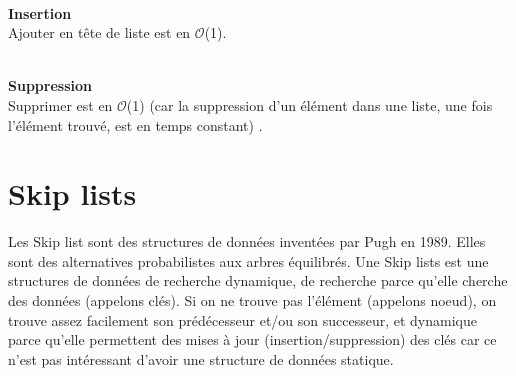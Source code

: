 \documentclass[hidelinks,a4paper,12pt]{article}
\begin{document}
~\\

\textbf {Insertion} \\
Ajouter en tête de liste est en $\mathcal{O}$(1)\cite{ArticleFacSciencesLile}.

~\\

\textbf {Suppression} \\
Supprimer est en $\mathcal{O}$(1) (car la suppression d’un élément dans une liste, une fois l’élément trouvé, est en temps constant) \cite{ArticleFacSciencesLile}.


	
	
\newpage		
\section{Skip lists}

Les Skip list sont des structures de données inventées par Pugh en 1989. Elles sont des alternatives probabilistes aux arbres équilibrés. 
Une Skip lists est une structures de données de recherche dynamique, de recherche parce qu’elle cherche des données (appelons clés). Si on ne trouve pas l'élément (appelons noeud), on trouve assez facilement son prédécesseur et/ou son successeur, et dynamique parce qu’elle permettent des mises à jour (insertion/suppression) des clés car ce n’est pas intéressant d’avoir une structure de données statique.
\end{document}
